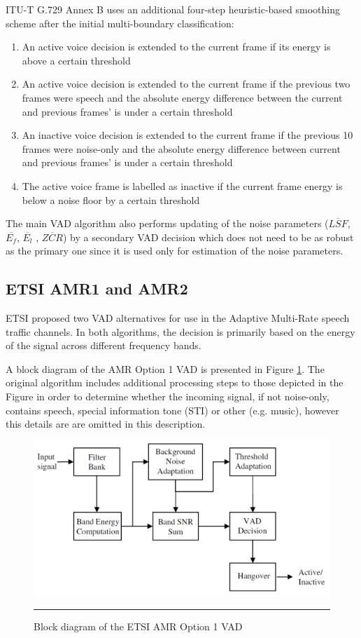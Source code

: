 ITU-T G.729 Annex B uses an additional four-step heuristic-based smoothing scheme after the initial multi-boundary classification:
\begin{enumerate}
\item An active voice decision is extended to the current frame if its energy is above a certain threshold
\item An active voice decision is extended to the current frame if the previous two frames were speech and the absolute energy difference between the current and previous frames' is under a certain threshold
\item An inactive voice decision is extended to the current frame if the previous 10 frames were noise-only and the absolute energy difference between current and previous frames' is under a certain threshold
\item The active voice frame is labelled as inactive if the current frame energy is below a noise floor by a certain threshold
\end{enumerate}

The main VAD algorithm also performs updating of the noise parameters ($\overline{LSF}$, $\overline{E_f}$, $\overline{E_l}$ , $\overline{ZCR}$) by a secondary VAD decision which does not need to be as robust as the primary one since it is used only for estimation of the noise parameters.

\subsection{ETSI AMR1 and AMR2}

ETSI proposed two VAD alternatives for use in the Adaptive Multi-Rate speech traffic channels. In both algorithms, the decision is primarily based on the energy of the signal across different frequency bands.

A block diagram of the AMR Option 1 VAD is presented in Figure \ref{fig:AMR1}. The original algorithm includes additional processing steps to those depicted in the Figure in order to determine whether the incoming signal, if not noise-only, contains speech, special information tone (STI) or other (e.g. music), however this details are are omitted in this description.

\begin{figure}[htbp]
	\centering
		\includegraphics[width=0.9\columnwidth]{Figures/Chapter2/AMR1.png}
		\rule{37em}{0.5pt}
	\caption[Block diagram of the ETSI AMR Option 1 VAD]{Block diagram of the ETSI AMR Option 1 VAD \cite{Kondoz}}
	\label{fig:AMR1}
\end{figure}

